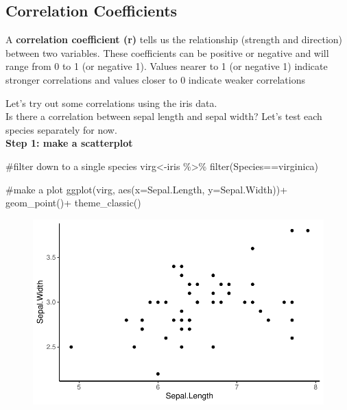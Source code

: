 \documentclass[
  letterpaper,
  DIV=11,
  numbers=noendperiod]{scrartcl}
\newenvironment{Shaded}{\begin{snugshade}}{\end{snugshade}}
\newcommand{\AttributeTok}[1]{\textcolor[rgb]{0.40,0.45,0.13}{#1}}
\newcommand{\CommentTok}[1]{\textcolor[rgb]{0.37,0.37,0.37}{#1}}
\newcommand{\FunctionTok}[1]{\textcolor[rgb]{0.28,0.35,0.67}{#1}}
\newcommand{\NormalTok}[1]{\textcolor[rgb]{0.00,0.23,0.31}{#1}}
\newcommand{\OtherTok}[1]{\textcolor[rgb]{0.00,0.23,0.31}{#1}}
\newcommand{\SpecialCharTok}[1]{\textcolor[rgb]{0.37,0.37,0.37}{#1}}
\newcommand{\StringTok}[1]{\textcolor[rgb]{0.13,0.47,0.30}{#1}}
\begin{document}
\subsection{Correlation Coefficients}

A \textbf{correlation coefficient (r)} tells us the relationship
(strength and direction) between two variables. These coefficients can
be positive or negative and will range from 0 to 1 (or negative 1).
Values nearer to 1 (or negative 1) indicate stronger correlations and
values closer to 0 indicate weaker correlations

Let's try out some correlations using the iris data.\\
Is there a correlation between sepal length and sepal width? Let's test
each species separately for now.\\
\textbf{Step 1: make a scatterplot}

\begin{Shaded}
\begin{Highlighting}[]
\CommentTok{\#filter down to a single species}
\NormalTok{virg}\OtherTok{\textless{}{-}}\NormalTok{iris }\SpecialCharTok{\%\textgreater{}\%}
  \FunctionTok{filter}\NormalTok{(Species}\SpecialCharTok{==}\StringTok{\textquotesingle{}virginica\textquotesingle{}}\NormalTok{)}

\CommentTok{\#make a plot}
\FunctionTok{ggplot}\NormalTok{(virg, }\FunctionTok{aes}\NormalTok{(}\AttributeTok{x=}\NormalTok{Sepal.Length, }\AttributeTok{y=}\NormalTok{Sepal.Width))}\SpecialCharTok{+}
  \FunctionTok{geom\_point}\NormalTok{()}\SpecialCharTok{+}
  \FunctionTok{theme\_classic}\NormalTok{()}
\end{Highlighting}
\end{Shaded}

\begin{figure}[H]

{\centering \includegraphics{cor_reg_chi_files/figure-pdf/unnamed-chunk-2-1.pdf}

}

\end{figure}
\end{document}
